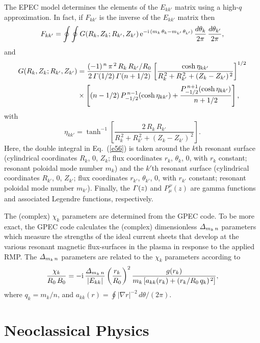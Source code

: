 \documentclass[notitlepage,12pt]{article}
\begin{document}
The EPEC model determines the elements of the $E_{kk'}$ matrix using a high-$q$ approximation. In fact, if $F_{kk'}$ is the inverse of the $E_{kk'}$ matrix then
\begin{equation}\label{e56}
F_{kk'} = \oint\oint 
G(R_k,Z_k;R_{k'},Z_{k'})\,{\rm e}^{-{\rm i}\,(m_k\,\theta_k-m_{k'}\,\theta_{k'})}\,\frac{d\theta_k}{2\pi}\,\frac{d\theta_{k'}}{2\pi},
\end{equation}
and
\begin{align}
 G(R_k,Z_k;R_{k'},Z_{k'})&= \frac{(-1)^{\,n}\,\pi^{\,2}\,R_k\,R_{k'}/R_0}{2\,{\mit\Gamma}(1/2)\,{\mit\Gamma}(n+1/2)}
\left[\frac{\cosh\eta_{kk'}}{R_k^{\,2}+R_{k'}^{\,2}+(Z_k-Z_{k'})^{\,2}}\right]^{1/2}\nonumber\\[0.5ex]
&\times\left[(n-1/2)\,P_{-1/2}^{\,n-1}(\cosh\eta_{kk'})+
\frac{P_{-1/2}^{\,n+1}(\cosh\eta_{kk'})}{n+1/2}\right],
\end{align}
with
\begin{equation}
\eta_{kk'} = \tanh^{-1}\left[\frac{2\,R_k\,R_{k'}}{R_k^{\,2}+R_{k'}^{\,2}+(Z_k-Z_{k'})^{\,2}}\right].
\end{equation}
Here, the double integral in Eq.~(\ref{e56}) is taken around the
$k$th resonant surface (cylindrical coordinates $R_k$, $0$, $Z_k$;
flux coordinates $r_k$, $\theta_k$, $0$, with $r_k$ constant; resonant poloidal mode number $m_k$) and the $k'$th resonant surface (cylindrical coordinates $R_{k'}$, $0$, $Z_{k'}$;
flux coordinates $r_{k'}$, $\theta_{k'}$, $0$, with $r_{k'}$ constant; resonant poloidal mode number $m_{k'}$). Finally, the ${\mit\Gamma}(z)$ and $P_\mu^{\,\nu}(z)$ are gamma functions and associated Legendre functions, respectively.

The (complex) $\chi_k$ parameters are determined from the GPEC code.
To be more exact, the GPEC code calculates the (complex) dimensionless ${\mit\Delta}_{m_k\,n}$ parameters which measure the strengths of the ideal current sheets that develop
at the various resonant magnetic flux-surfaces in the plasma in response to the applied RMP.  The ${\mit\Delta}_{m_k\,n}$ parameters are related to the $\chi_k$ parameters according to
\begin{equation}\label{a8}
\frac{\chi_k}{R_0\,B_0} = -{\rm i} \,\frac{{\mit\Delta}_{m_k\,n}}{|E_{kk}|}\left(\frac{r_k}{R_0}\right)^2
\frac{g(r_k)}{m_k\,[a_{kk}(r_k)+ (r_k/R_0\,q_k)^{\,2}]},
\end{equation}
where $q_k= m_k/n$, and $a_{kk}(r) = \oint |\nabla r|^{-2}\,d\theta/(2\pi)$. 

\section{Neoclassical Physics}\label{appb}
\end{document}
